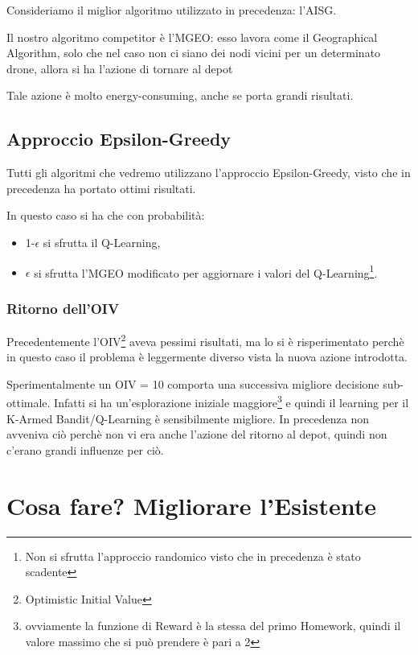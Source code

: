 \documentclass[12pt]{article}
\begin{document}
Consideriamo il miglior algoritmo utilizzato in precedenza: l'AISG.

Il nostro algoritmo competitor è l'MGEO: esso lavora come il Geographical Algorithm, solo che nel caso non ci siano dei nodi vicini per un determinato drone, allora si ha l'azione di tornare al depot

Tale azione è molto energy-consuming, anche se porta grandi risultati.


\subsection{Approccio Epsilon-Greedy}

Tutti gli algoritmi che vedremo utilizzano l'approccio Epsilon-Greedy, visto che in precedenza ha portato ottimi risultati. 

In questo caso si ha che con probabilità:

\begin{itemize}

    \item 1-$\epsilon$ si sfrutta il Q-Learning, 
    
    \item $\epsilon$ si sfrutta l'MGEO modificato per aggiornare i valori del Q-Learning\footnote{Non si sfrutta l'approccio randomico visto che in precedenza è stato scadente}. 
    
\end{itemize}


\subsubsection{Ritorno dell'OIV}

Precedentemente l'OIV\footnote{Optimistic Initial Value} aveva pessimi risultati, ma lo si è risperimentato perchè in questo caso il problema è leggermente diverso vista la nuova azione introdotta.

Sperimentalmente un OIV = 10 comporta una successiva migliore decisione sub-ottimale. Infatti si ha un'esplorazione iniziale maggiore\footnote{ovviamente la funzione di Reward è la stessa del primo Homework, quindi il valore massimo che si può prendere è pari a 2} e quindi il learning per il K-Armed Bandit/Q-Learning è sensibilmente migliore. In precedenza non avveniva ciò perchè non vi era anche l'azione del ritorno al depot, quindi non c'erano grandi influenze per ciò.

\section{Cosa fare? Migliorare l'Esistente}
\end{document}
